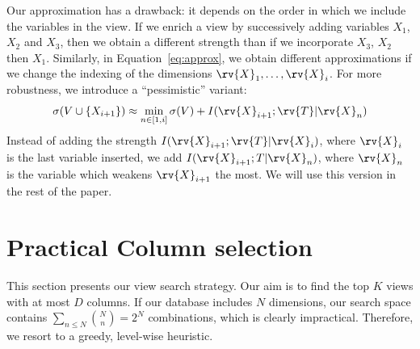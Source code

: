 Our approximation has a drawback: it depends on the order in which we include
the variables in the view. If we enrich a view by successively adding variables
$X_1$, $X_2$ and $X_3$, then we obtain a different strength than if we
incorporate $X_3$, $X_2$ then $X_1$. Similarly, in Equation~\ref{eq:approx}, we
obtain different approximations if we change the indexing of the dimensions
$\rv{X}_1, \ldots, \rv{X}_i$.  For more robustness, we introduce a
``pessimistic'' variant:
\begin{equation}\label{eq:robustapprox}
    \sigma(V \cup \{X_{i+1}\}) 
    \approx \min_{n \in [1, i]} \sigma(V) + I(\rv{X}_{i+1} ; \rv{T} | \rv{X}_{n})
\end{equation}
Instead of adding the strength $I(\rv{X}_{i+1}; \rv{T} | \rv{X}_i)$, where
$\rv{X}_i$ is the last variable inserted, we add $I(\rv{X}_{i+1}; T |
\rv{X}_n)$, where $\rv{X}_n$ is the variable which weakens $\rv{X}_{i+1}$ the
most. We will use this version in the rest of the paper.







\section{Practical Column selection}
\label{sec:column}
This section presents our view search strategy. Our aim is to find the top $K$
views with at most $D$ columns. If our database includes $N$ dimensions, our
search space contains $\sum_{n \leq N} \binom{N}{n} = 2^N$ combinations, which
is clearly impractical. Therefore, we resort to a  greedy, level-wise
heuristic.

